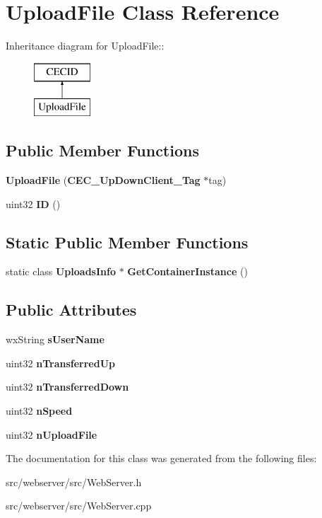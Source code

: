 \section{UploadFile Class Reference}
\label{classUploadFile}
Inheritance diagram for UploadFile::\begin{figure}[H]
\begin{center}
\leavevmode
\includegraphics[height=2cm]{classUploadFile}
\end{center}
\end{figure}
\subsection*{Public Member Functions}
\begin{DoxyCompactItemize}
\item 
{\bfseries UploadFile} ({\bf CEC\_\-UpDownClient\_\-Tag} $\ast$tag)\label{classUploadFile_ad49b7b74bdc1d8892fb5aaed78f16e9a}

\item 
uint32 {\bfseries ID} ()\label{classUploadFile_adec144414eff1db0d214e1f73ef474c5}

\end{DoxyCompactItemize}
\subsection*{Static Public Member Functions}
\begin{DoxyCompactItemize}
\item 
static class {\bf UploadsInfo} $\ast$ {\bfseries GetContainerInstance} ()\label{classUploadFile_a5d8d843b4df9f726303f21242e883637}

\end{DoxyCompactItemize}
\subsection*{Public Attributes}
\begin{DoxyCompactItemize}
\item 
wxString {\bfseries sUserName}\label{classUploadFile_aaf17c1a5376869174fcf95f006306520}

\item 
uint32 {\bfseries nTransferredUp}\label{classUploadFile_acb7ad30d28cb728b3f3478d01a93f5d9}

\item 
uint32 {\bfseries nTransferredDown}\label{classUploadFile_a96343ba93a78ca0270bb0f3ad0ad9605}

\item 
uint32 {\bfseries nSpeed}\label{classUploadFile_aeadb3a21f29468440adb303fd6a7bf06}

\item 
uint32 {\bfseries nUploadFile}\label{classUploadFile_a28eba36068e5430e095faef8695d30ff}

\end{DoxyCompactItemize}


The documentation for this class was generated from the following files:\begin{DoxyCompactItemize}
\item 
src/webserver/src/WebServer.h\item 
src/webserver/src/WebServer.cpp\end{DoxyCompactItemize}
